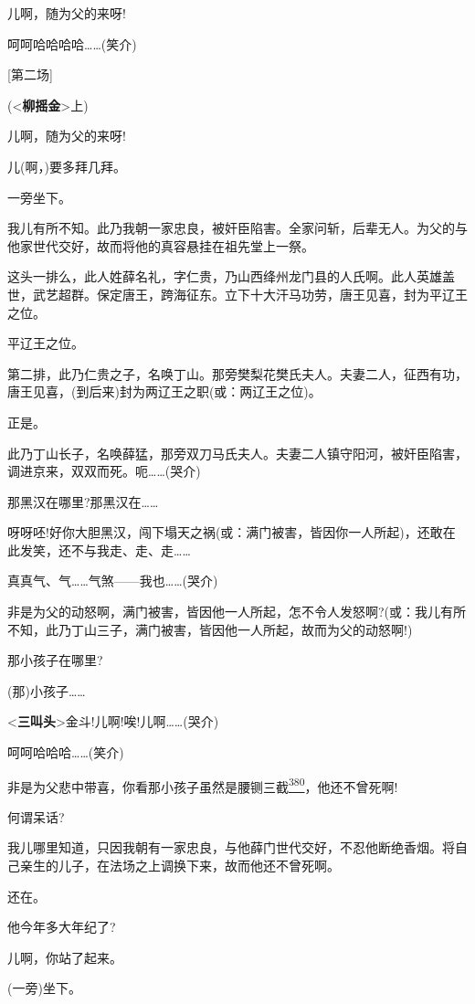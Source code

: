 儿啊，随为父的来呀!

呵呵哈哈哈哈\ldots{}\ldots{}(笑介)

{[}第二场{]}

(\textless{}\textbf{柳摇金}\textgreater{}上)

儿啊，随为父的来呀!

儿(啊，)要多拜几拜。

一旁坐下。

我儿有所不知。此乃我朝一家忠良，被奸臣陷害。全家问斩，后辈无人。为父的与他家世代交好，故而将他的真容悬挂在祖先堂上一祭。

这头一排么，此人姓薛名礼，字仁贵，乃山西绛州龙门县的人氏啊。此人英雄盖世，武艺超群。保定唐王，跨海征东。立下十大汗马功劳，唐王见喜，封为平辽王之位。

平辽王之位。

第二排，此乃仁贵之子，名唤丁山。那旁樊梨花樊氏夫人。夫妻二人，征西有功，唐王见喜，(到后来)封为两辽王之职(或：两辽王之位)。

正是。

此乃丁山长子，名唤薛猛，那旁双刀马氏夫人。夫妻二人镇守阳河，被奸臣陷害，调进京来，双双而死。呃\ldots{}\ldots{}(哭介)

那黑汉在哪里?那黑汉在\ldots{}\ldots{}

呀呀呸!好你大胆黑汉，闯下塌天之祸(或：满门被害，皆因你一人所起)，还敢在此发笑，还不与我走、走、走\ldots{}\ldots{}

真真气、气\ldots{}\ldots{}气煞------我也\ldots{}\ldots{}(哭介)

非是为父的动怒啊，满门被害，皆因他一人所起，怎不令人发怒啊?(或：我儿有所不知，此乃丁山三子，满门被害，皆因他一人所起，故而为父的动怒啊!)

那小孩子在哪里?

(那)小孩子\ldots{}\ldots{}

\textless{}\textbf{三叫头}\textgreater{}金斗!儿啊!唉!儿啊\ldots{}\ldots{}(哭介)

呵呵哈哈哈\ldots{}\ldots{}(笑介)

非是为父悲中带喜，你看那小孩子虽然是腰铡三截\protect\hyperlink{fn380}{\textsuperscript{380}}，他还不曾死啊!

何谓呆话?

我儿哪里知道，只因我朝有一家忠良，与他薛门世代交好，不忍他断绝香烟。将自己亲生的儿子，在法场之上调换下来，故而他还不曾死啊。

还在。

他今年多大年纪了?

儿啊，你站了起来。

(一旁)坐下。

